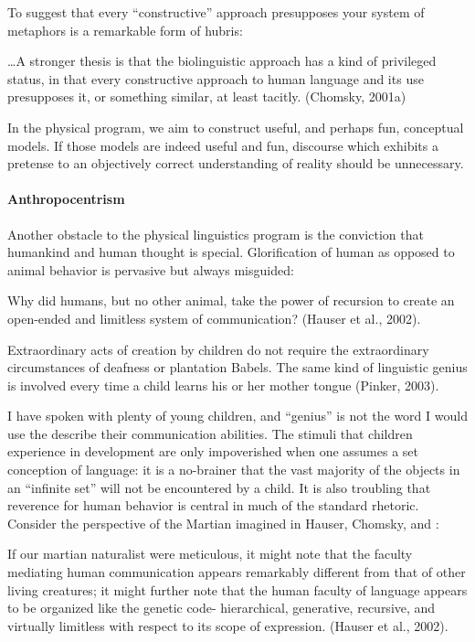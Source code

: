 To suggest that every “constructive” approach presupposes your system of metaphors is a remarkable form of hubris:

…A stronger thesis is that the biolinguistic approach has a kind of privileged status, in that every constructive approach to human language and its use presupposes it, or something similar, at least tacitly. (Chomsky, 2001a)

  In the physical program, we aim to construct useful, and perhaps fun, conceptual models. If those models are indeed useful and fun, discourse which exhibits a pretense to an objectively correct understanding of reality should be unnecessary.

\paragraph{Anthropocentrism}

Another obstacle to the physical linguistics program is the conviction that humankind and human thought is special. Glorification of human as opposed to animal behavior is pervasive but always misguided:

Why did humans, but no other animal, take the power of recursion to create an open-ended and limitless system of communication? (Hauser et al., 2002).

Extraordinary acts of creation by children do not require the extraordinary circumstances of deafness or plantation Babels. The same kind of linguistic genius is involved every time a child learns his or her mother tongue (Pinker, 2003).

  I have spoken with plenty of young children, and “genius” is not the word I would use the describe their communication abilities. The stimuli that children experience in development are only impoverished when one assumes a set conception of language: it is a no-brainer that the vast majority of the objects in an “infinite set” will not be encountered by a child. It is also troubling that reverence for human behavior is central in much of the standard rhetoric. Consider the perspective of the Martian imagined in Hauser, Chomsky, and \citet{Fitch2002}:

If our martian naturalist were meticulous, it might note that the faculty mediating human communication appears remarkably different from that of other living creatures; it might further note that the human faculty of language appears to be organized like the genetic code- hierarchical, generative, recursive, and virtually limitless with respect to its scope of expression. (Hauser et al., 2002).

